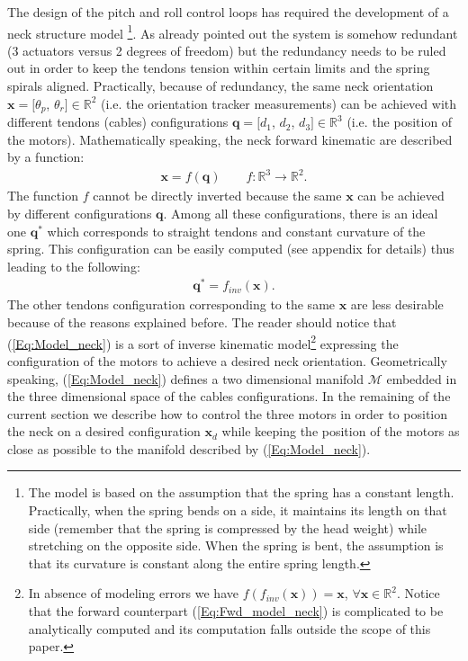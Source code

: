 \documentclass[conference]{IEEEtran}
\numberwithin{equation}{section}
\newcommand{\q}{\mathbf{q}}
\newcommand{\x}{\mathbf{x}}
\begin{document}
The design of the pitch and roll control loops has required the development of a neck structure model \footnote{The model is based on the assumption that the spring has a constant length. Practically, when the spring bends on a side, it maintains its length on that side (remember that the spring is compressed by the head weight) while stretching on the opposite side. When the spring is bent, the assumption is that its curvature is constant along the entire spring length.}.
As already pointed out the system is somehow redundant (3 actuators versus 2 degrees of freedom) but the redundancy needs to be ruled out in order to keep the tendons tension within certain limits and the spring spirals aligned. Practically, because of redundancy, the same neck orientation $\x = [\theta_p$, $\theta_r] \in \mathbb R^2$ (i.e. the orientation tracker measurements) can be achieved with different tendons (cables) configurations $\q = [d_1$, $d_2$, $d_3] \in \mathbb R^3$ (i.e. the position of the motors). Mathematically speaking, the neck forward kinematic are described by a function:
\begin{eqnarray} \label{Eq:Fwd_model_neck}
\x = f (\q) \qquad f:\mathbb{R}^3 \rightarrow \mathbb{R}^2.
\end{eqnarray}
The function $f$ cannot be directly inverted because the same $\x$ can be achieved by different configurations $\q$. Among all these configurations, there is an ideal one $\q^*$ which corresponds to straight tendons and constant curvature of the spring. This configuration can be easily computed (see appendix for details) thus leading to the following:
\begin{eqnarray} \label{Eq:Model_neck}
\q^* = f_{inv} (\x).
\end{eqnarray}
The other tendons configuration corresponding to the same $\x$ are less desirable because of the reasons explained before. The reader should notice that (\ref{Eq:Model_neck}) is a sort of inverse kinematic model\footnote{In absence of modeling errors we have $f(f_{inv}(\x)) = \x$, $\forall \x \in \mathbb R^2$. Notice that the forward counterpart (\ref{Eq:Fwd_model_neck}) is  complicated to be analytically computed and its computation falls outside the scope of this paper.} expressing the configuration of the motors to achieve a desired neck orientation. Geometrically speaking, (\ref{Eq:Model_neck}) defines a two dimensional manifold $\mathcal M$ embedded in the three dimensional space of the cables configurations.
In the remaining of the current section we describe how to control the three motors in order to position the neck on a desired configuration $\x_d$ while keeping the position of the motors as close as possible to the manifold described by (\ref{Eq:Model_neck}).
\end{document}
